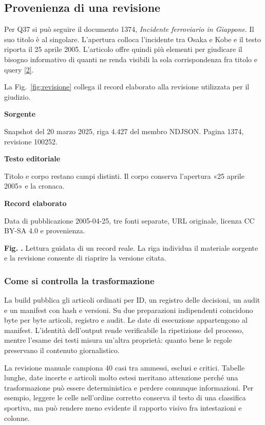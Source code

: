 \documentclass[11pt,a4paper]{article}
\newcommand{\legendnote}[2]{\refstepcounter{figure}\label{fig:#1}\par{\small\sffamily\color{ink}\textbf{Fig. \thefigure.} #2\par}}
\newcommand{\branchrow}[2]{\par\noindent\colorbox{pale}{\parbox{0.27\linewidth}{\strut\sffamily\bfseries\color{ink} #1}}\hfill\parbox{0.67\linewidth}{\sffamily\small #2}\par}
\newcommand{\citeproc}[2]{\hyperlink{#1}{#2}}
\begin{document}
\clearpage

\subsection{Provenienza di una revisione}\label{provenienza-di-una-revisione}

Per Q37 si può seguire il documento 1374, \emph{Incidente ferroviario in Giappone}. Il suo titolo è al singolare. L'apertura colloca l'incidente tra Osaka e Kobe e il testo riporta il 25 aprile 2005. L'articolo offre quindi più elementi per giudicare il bisogno informativo di quanti ne renda visibili la sola corrispondenza fra titolo e query \citeproc{ref-wiki}{{[}2{]}}.

La Fig.~\ref{fig:revisione} collega il record elaborato alla revisione utilizzata per il giudizio.

\branchrow{Sorgente}{Snapshot del 20 marzo 2025, riga 4.427 del membro NDJSON. Pagina 1374, revisione 100252.}
\branchrow{Testo editoriale}{Titolo e corpo restano campi distinti. Il corpo conserva l’apertura «25 aprile 2005» e la cronaca.}
\branchrow{Record elaborato}{Data di pubblicazione 2005-04-25, tre fonti separate, URL originale, licenza CC BY-SA 4.0 e provenienza.}
\legendnote{revisione}{Lettura guidata di un record reale. La riga individua il materiale sorgente e la revisione consente di riaprire la versione citata.}

\subsubsection{Come si controlla la trasformazione}\label{come-si-controlla-la-trasformazione}

La build pubblica gli articoli ordinati per ID, un registro delle decisioni, un audit e un manifest con hash e versioni. Su due preparazioni indipendenti coincidono byte per byte articoli, registro e audit. Le date di esecuzione appartengono al manifest. L'identità dell'output rende verificabile la ripetizione del processo, mentre l'esame dei testi misura un'altra proprietà: quanto bene le regole preservano il contenuto giornalistico.

La revisione manuale campiona 40 casi tra ammessi, esclusi e critici. Tabelle lunghe, date incerte e articoli molto estesi meritano attenzione perché una trasformazione può essere deterministica e perdere comunque informazioni. Per esempio, leggere le celle nell'ordine corretto conserva il testo di una classifica sportiva, ma può rendere meno evidente il rapporto visivo fra intestazioni e colonne.
\end{document}
